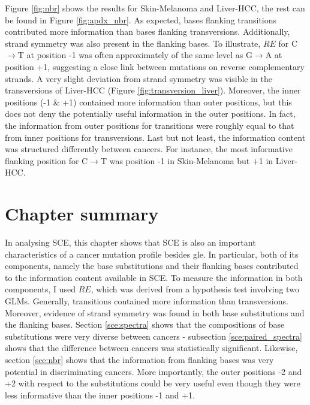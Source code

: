Figure \ref{fig:nbr} shows the results for Skin-Melanoma and Liver-HCC, the rest can be found in Figure \ref{fig:apdx_nbr}. As expected, bases flanking transitions contributed more information than bases flanking transversions. Additionally, strand symmetry was also present in the flanking bases. To illustrate, $RE$ for C$\rightarrow$T at position -1 was often approximately of the same level as G$\rightarrow$A at position +1, suggesting a close link between mutations on reverse complementary strands. A very slight deviation from strand symmetry was visible in the transversions of Liver-HCC (Figure \ref{fig:transversion_liver}). Moreover, the inner positions (-1 \& +1) contained more information than outer positions, but this does not deny the potentially useful information in the outer positions. In fact, the information from outer positions for transitions were roughly equal to that from inner positions for transversions. Last but not least, the information content was structured differently between cancers. For instance, the most informative flanking position for C$\rightarrow$T was position -1 in Skin-Melanoma but +1 in Liver-HCC.


\section{Chapter summary}
In analysing SCE, this chapter shows that SCE is also an important characteristics of a cancer mutation profile besides \gls{gle}. In particular, both of its components, namely the base substitutions and their flanking bases contributed to the information content available in SCE. To measure the information in both components, I used $RE$, which was derived from a hypothesis test involving two GLMs. Generally, transitions contained more information than transversions. Moreover, evidence of strand symmetry was found in both base substitutions and the flanking bases. Section \ref{sce:spectra} shows that the compositions of base substitutions were very diverse between cancers - subsection \ref{sce:paired_spectra} shows that the difference between cancers was statistically significant. Likewise, section \ref{sce:nbr} shows that the information from flanking bases was very potential in discriminating cancers. More importantly, the outer positions -2 and +2 with respect to the substitutions could be very useful even though they were less informative than the inner positions -1 and +1.